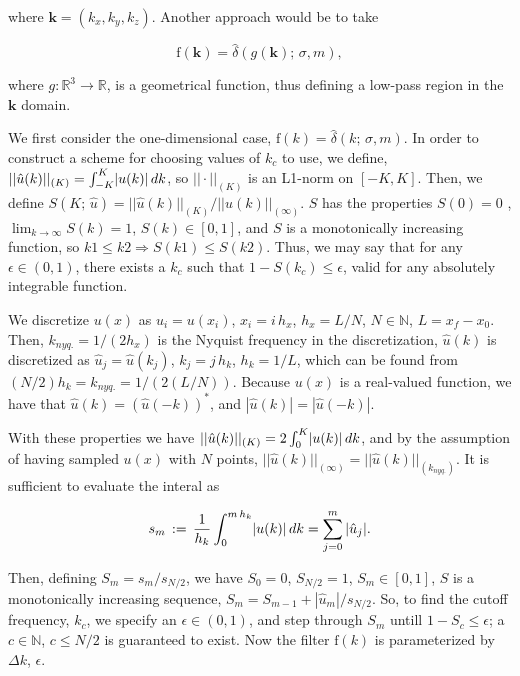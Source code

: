 \documentclass[amsmath,amssymb,floatfix]{revtex4}
\numberwithin{equation}{section}
\newcommand{\Integral}[4]{ \int_{#1}^{#2}  \hspace{-2pt} #3 \, d #4 }
\begin{document}
\noindent where $\mathbf{k} = (k_x,k_y,k_z)$. Another approach would be to take 

\begin{equation}
\textrm{f}(\mathbf{k}) = \hat{\delta} (g(\mathbf{k}); \, \sigma, m),
\end{equation}

\noindent where  ${g}: \mathbb{R}^3 \rightarrow \mathbb{R}$, is a geometrical function, thus defining a low-pass region in the $\mathbf{k}$ domain.

We first consider the one-dimensional case, $\textrm{f}({k}) = \hat{\delta} (k; \, \sigma, m)$. In order to construct a scheme for choosing values of $k_c$ to use, we define, $|| \hat{u}(k) ||_{(K)} = \Integral{-K}{K}{|u(k)|}{k}$, so $|| \cdot ||_{(K)}$ is an L1-norm on $[-K,K]$. Then, we define $S(K; \, \hat{u}) = || \hat{u}(k) ||_{(K)} / || \hat{u}(k) ||_{(\infty)}$. $S$ has the properties $S(0) = 0$ , $\lim_{k \rightarrow \infty} S(k) = 1$, $S(k) \in [0,1]$, and $S$ is a monotonically increasing function, so $k1 \le k2 \Rightarrow S(k1) \le S(k2)$. Thus, we may say that for any $\epsilon \in (0,1)$, there exists a $k_c$ such that $1 - S(k_c) \le \epsilon$, valid for any absolutely integrable function. 

We discretize $u(x)$ as $u_i=u(x_i)$, $x_i = i \, h_x $, $h_x = L/N$, $N \in \mathbb{N}$, $L=x_f-x_0$. Then, $k_{nyq.} = 1/(2 h_x)$ is the Nyquist frequency in the discretization, $\hat{u}(k)$ is discretized as $\hat{u}_j = \hat{u}(k_j)$, $k_j = j \, h_k$, $h_k = 1/L$, which can be found from $(N/2) h_k = k_{nyq.} = 1/(2(L/N))$. Because $u(x)$ is a real-valued function, we have that $\hat{u}(k) = (\hat{u}(-k))^*$, and $|\hat{u}(k)| = |\hat{u}(-k)|$.
	
	With these properties we have $|| \hat{u}(k) ||_{(K)} = 2 \Integral{0}{K}{|u(k)|}{k}$, and by the assumption of having sampled $u(x)$ with $N$ points, $|| \hat{u}(k) ||_{(\infty)} = || \hat{u}(k) ||_{(k_{nyq.})}$. It is sufficient to evaluate the interal as 

\begin{equation}	
	s_m \, := \, \frac{1}{ h_k}	\Integral{0}{m \, h_k}{|u(k)|}{k} = \sum_{j=0}^{m} |\hat{u}_j|.
\end{equation}

Then, defining $S_m = s_m/s_{N / 2}$, we have $S_0 = 0$, $S_{N/2} = 1$, $S_m \in [0,1]$, $S$ is a monotonically increasing sequence, $S_{m} = S_{m-1} + |\hat{u}_m|/s_{N / 2}$. So, to find the cutoff frequency, $k_c$, we specify an $\epsilon \in (0,1)$, and step through $S_m$ untill $1 - S_c \le \epsilon$; a $c \in \mathbb{N}$, $c \le N/2$ is guaranteed to exist. Now the filter $\textrm{f}({k})$ is parameterized by $\Delta k$, $\epsilon$.
\end{document}
